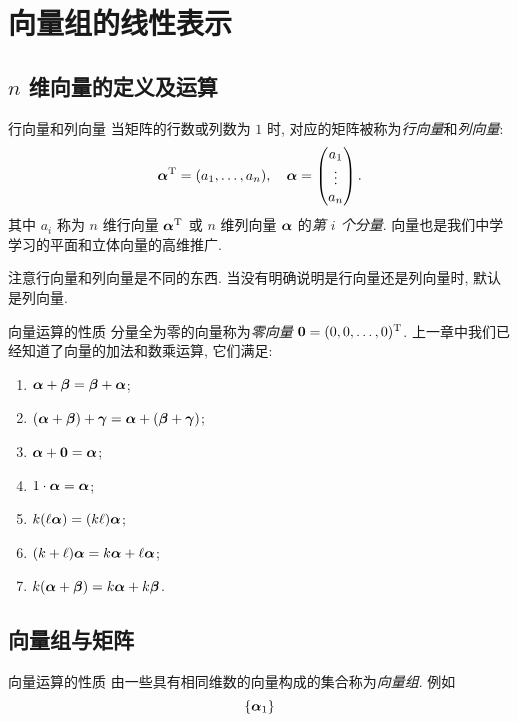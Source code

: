 \section{向量组的线性表示}

\subsection{\texorpdfstring{$n$}{n} 维向量的定义及运算}

\begin{frame}{行向量和列向量}
	\onslide<+->
	当矩阵的行数或列数为 $1$ 时, 对应的矩阵被称为\emph{行向量}和\emph{列向量}:
	\[{{\boldsymbol{\alpha}}}^{\mathrm{T}}=(a_1,\dots,a_n),\quad
	{{\boldsymbol{\alpha}}}=\begin{pmatrix}
		a_1\\\vdots\\a_n
	\end{pmatrix}.\]
	\onslide<+->
	其中 $a_i$ 称为 $n$ 维行向量 ${{\boldsymbol{\alpha}}}^{\mathrm{T}}$ 或 $n$ 维列向量 ${{\boldsymbol{\alpha}}}$ 的\emph{第 $i$ 个分量}.
	\onslide<+->
	向量也是我们中学学习的平面和立体向量的高维推广.

	\onslide<+->
	注意行向量和列向量是不同的东西.
	当没有明确说明是行向量还是列向量时, 默认是\alert{列向量}.
\end{frame}


\begin{frame}{向量运算的性质}
	\onslide<+->
	分量全为零的向量称为\emph{零向量} ${\bf0}=(0,0,\dots,0)^{\mathrm{T}}$.
	\onslide<+->
	上一章中我们已经知道了向量的加法和数乘运算, 它们满足:
	\begin{enumerate}
		\item ${\boldsymbol{\alpha}}+{\boldsymbol{\beta}}={\boldsymbol{\beta}}+{\boldsymbol{\alpha}}$;
		\item $({\boldsymbol{\alpha}}+{\boldsymbol{\beta}})+{\boldsymbol{\gamma}}={\boldsymbol{\alpha}}+({\boldsymbol{\beta}}+{\boldsymbol{\gamma}})$;
		\item ${\boldsymbol{\alpha}}+{\bf0}={\boldsymbol{\alpha}}$;
		\item $1\cdot{\boldsymbol{\alpha}}={\boldsymbol{\alpha}}$;
		\item $k(\ell{\boldsymbol{\alpha}})=(k\ell){\boldsymbol{\alpha}}$;
		\item $(k+\ell){\boldsymbol{\alpha}}=k{\boldsymbol{\alpha}}+\ell{\boldsymbol{\alpha}}$;
		\item $k({\boldsymbol{\alpha}}+{\boldsymbol{\beta}})=k{\boldsymbol{\alpha}}+k{\boldsymbol{\beta}}$.
	\end{enumerate}
\end{frame}


\subsection{向量组与矩阵}


\begin{frame}{向量运算的性质}
	\onslide<+->
	由一些具有相同维数的向量构成的集合称为\emph{向量组}.
	\onslide<+->
	例如
	\[\{{\boldsymbol{\alpha}}_1\}\]
\end{frame}
